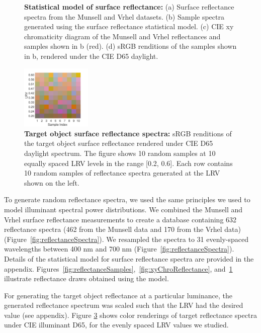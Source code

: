 \documentclass{jov}
\begin{document}
\begin{figure}
\begin{subfigure}{0.24 \textwidth}
        \label{fig:backgroundSwatches}
    \end{subfigure}
    \caption{{\bf Statistical model of surface reflectance:} (a) Surface reflectance spectra from the Munsell and Vrhel datasets. (b) Sample spectra generated using the surface reflectance statistical model. (c) CIE xy chromaticity diagram of the Munsell and Vrhel reflectances and samples shown in b (red). (d) sRGB renditions of the samples shown in b, rendered under the CIE D65 daylight.}
\label{fig:surfaceReflectanceGeneration}
\end{figure}

\begin{figure}
\centering
\includegraphics[width=0.3\textwidth]{../FiguresDraft5/Figure8/Figure8.pdf}
\caption{{\bf Target object surface reflectance spectra:} sRGB renditions of the target object surface reflectance rendered under CIE D65 daylight spectrum. The figure shows 10 random samples at 10 equally spaced LRV levels in the range [0.2, 0.6]. Each row contains 10 random samples of reflectance spectra generated at the LRV shown on the left.}
\label{fig:targetSwatches}
\end{figure}

To generate random reflectance spectra, we used the same principles we used to model illuminant spectral power distributions.
We combined the Munsell \cite{kelly1943tristimulus} and Vrhel \cite{vrhel1994measurement} surface reflectance 
measurements to create a database containing 632 reflectance spectra (462 from the Munsell data and 170 from the Vrhel data) (Figure~\ref{fig:reflectanceSpectra}).
We resampled the spectra to 31 evenly-spaced wavelengths between 400 nm and 700 nm (Figure~\ref{fig:reflectanceSpectra}).
Details of the statistical model for surface reflectance spectra are provided in the appendix. 
Figures~\ref{fig:reflectanceSamples},~\ref{fig:xyChroReflectance}, and~\ref{fig:backgroundSwatches} illustrate reflectance draws obtained using the model. 

For generating the target object reflectance at a particular luminance, the generated reflectance spectrum was 
scaled such that the LRV had the desired value (see appendix).
Figure \ref{fig:targetSwatches} shows color renderings of target reflectance spectra under CIE illuminant D65, for the evenly spaced LRV values we studied.
\end{document}

